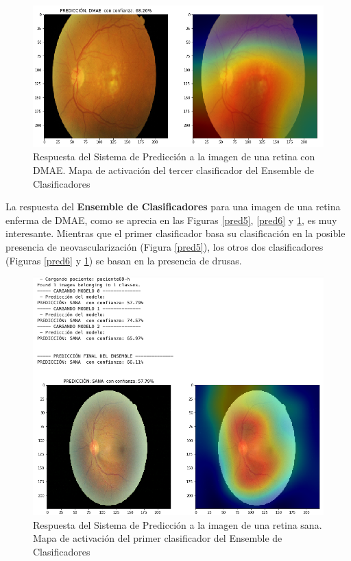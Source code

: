 \documentclass[
  12pt,
  spanish,
  a4paperpaper,
]{report}
\begin{document}
\begin{figure}
\centering
\includegraphics[width=1\textwidth,height=\textheight]{source/figures/pred7.png}
\caption{Respuesta del Sistema de Predicción a la imagen de una retina
con DMAE. Mapa de activación del tercer clasificador del Ensemble de
Clasificadores \label{pred7}}
\end{figure}

La respuesta del \textbf{Ensemble de Clasificadores} para una imagen de
una retina enferma de DMAE, como se aprecia en las Figuras \ref{pred5},
\ref{pred6} y \ref{pred7}, es muy interesante. Mientras que el primer
clasificador basa su clasificación en la posible presencia de
neovascularización (Figura \ref{pred5}), los otros dos clasificadores
(Figuras \ref{pred6} y \ref{pred7}) se basan en la presencia de drusas.

\begin{figure}
\centering
\includegraphics[width=1\textwidth,height=\textheight]{source/figures/pred8.png}
\caption{Respuesta del Sistema de Predicción a la imagen de una retina
sana. Mapa de activación del primer clasificador del Ensemble de
Clasificadores \label{pred8}}
\end{figure}
\end{document}
